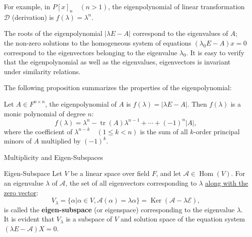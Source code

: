 \documentclass[11pt]{../../TexTemplate/elegantbook} %
\begin{document}
\begin{remark}
    For example, in \(P[x]_{n}\quad (n>1)\), the eigenpolynomial of linear transformation \( \mathcal{D} \) (derivation)
    is \( f(\lambda) = \lambda^n \).
\end{remark}

The roots of the eigenpolynomial $\lvert \lambda E-A \rvert$ correspond to the eigenvalues of $A$; 
the non-zero solutions to the homogeneous system of equations $(\lambda_{0}E-A)x=0$ 
correspond to the eigenvectors belonging to the eigenvalue $\lambda_{0}$.
It is easy to verify that the eigenpolynomial as well as the eigenvalues, eigenvectors is invariant under similarity relations.

\vspace{0.7cm}
The following proposition summarizes the properties of the eigenpolynomial:
\begin{proposition}
    Let \( A \in F^{n \times n} \), the eigenpolynomial of \( A \) is \( f(\lambda) = |\lambda E - A| \).
    Then \( f(\lambda) \) is a monic polynomial of degree \( n \):
    \[
    f(\lambda) = \lambda^n - \operatorname{tr}(A)\lambda^{n-1} + \cdots + (-1)^n |A|,
    \]
    where the coefficient of \( \lambda^{n-k}\quad(1 \leqslant k < n) \) is 
    the sum of all \( k \)-order principal minors of \( A \) multiplied by \( (-1)^k \).  
\end{proposition}

\begin{leftbarTitle}{Multiplicity and Eigen-Subspaces}\end{leftbarTitle}
\begin{definition}{Eigen-Subspace}
    Let \( V \) be a linear space over field \( F \), 
    and let \( \mathcal{A}\in \operatorname{Hom}(V) \).
    For an eigenvalue \( \lambda \) of \( \mathcal{A} \), 
    the set of all eigenvectors corresponding to \( \lambda \) \underline{along with the zero vector}:
    \[
    V_{\lambda} = \{ \alpha | \alpha \in V, \mathcal{A}(\alpha) = \lambda \alpha \} = 
    \operatorname{Ker}(\mathcal{A} - \lambda \mathcal{E}),
    \]
    is called the \textbf{eigen-subspace} (or eigenspace) corresponding to the eigenvalue \( \lambda \).
    It is evident that \( V_{\lambda} \) is a subspace of \( V \)
    and solution space of the equation system \( ( \lambda E - \mathcal{A})X = 0 \).
\end{definition}
\end{document}
